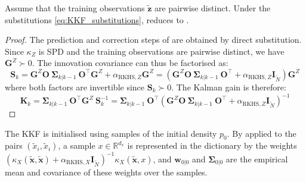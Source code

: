 \begin{proposition}\label{th:KKF}
	Assume that the training observations $\tilde{\mathbf{z}}$ are pairwise distinct. Under the substitutions \eqref{eq:KKF_substitutions},  reduces to .
\end{proposition}

\begin{proof}
	The prediction and correction steps of  are obtained by direct substitution. Since $\kappa_Z$ is SPD and the training observations are pairwise distinct, we have $\mathbf{G}^Z\succ0$. The innovation covariance can thus be factorised as:
	\begin{equation}
		\mathbf{S}_k=\mathbf{G}^Z\mathbf{O}\:\boldsymbol{\Sigma}_{k|k-1}\:\mathbf{O}^\top \mathbf{G}^Z+\alpha_{\mathrm{RKHS},Z}\mathbf{G}^Z=\left(\mathbf{G}^Z\mathbf{O}\:\boldsymbol{\Sigma}_{k|k-1}\:\mathbf{O}^\top+\alpha_{\mathrm{RKHS},Z}\mathbf{I}_{\tilde{N}}\right)\mathbf{G}^Z
	\end{equation}
	where both factors are invertible since $\mathbf{S}_k\succ0$. The Kalman gain is therefore:
	\begin{equation}
		\mathbf{K}_k=\boldsymbol{\Sigma}_{k|k-1}\:\mathbf{O}^\top \mathbf{G}^Z\:\mathbf{S}_k^{-1}=\boldsymbol{\Sigma}_{k|k-1}\:\mathbf{O}^\top\left(\mathbf{G}^Z\mathbf{O}\:\boldsymbol{\Sigma}_{k|k-1}\:\mathbf{O}^\top+\alpha_{\mathrm{RKHS},Z}\mathbf{I}_{\tilde{N}}\right)^{-1}
	\end{equation}
\end{proof}

The KKF is initialised using samples of the initial density $p_0$. By  applied to the pairs $\left(\tilde{x}_i,\tilde{x}_i\right)$, a sample $x\in\mathbb{R}^{d_x}$ is represented in the dictionary by the weights $\left(\kappa_X(\tilde{\mathbf{x}},\tilde{\mathbf{x}})+\alpha_{\mathrm{RKHS},X}\mathbf{I}_{\tilde{N}}\right)^{-1}\kappa_X(\tilde{\mathbf{x}},x)$, and $\mathbf{w}_{0|0}$ and $\boldsymbol{\Sigma}_{0|0}$ are the empirical mean and covariance of these weights over the samples.

\begin{algorithm}[!htb]
	\begin{algorithmic}
	\end{algorithmic}\caption{Kernel Kalman Filter}\label{alg:KKF}
\end{algorithm}

